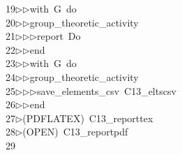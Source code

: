 \begin{tabbing}
19\>$\triangleright$\>$\triangleright$\>with\ G\ do\ \\[0pt]
20\>$\triangleright$\>$\triangleright$\>group\_theoretic\_activity\ \\[0pt]
21\>$\triangleright$\>$\triangleright$\>$\triangleright$\>report\ Do\ \\[0pt]
22\>$\triangleright$\>$\triangleright$\>end\ \\[0pt]
23\>$\triangleright$\>$\triangleright$\>with\ G\ do\ \\[0pt]
24\>$\triangleright$\>$\triangleright$\>group\_theoretic\_activity\ \\[0pt]
25\>$\triangleright$\>$\triangleright$\>$\triangleright$\>save\_elements\_csv\ C13\_eltscsv\ \\[0pt]
26\>$\triangleright$\>$\triangleright$\>end\\[0pt]
27\>$\triangleright$\>(PDFLATEX)\ C13\_reporttex\\[0pt]
28\>$\triangleright$\>(OPEN)\ C13\_reportpdf\\[0pt]
29\>\end{tabbing}
